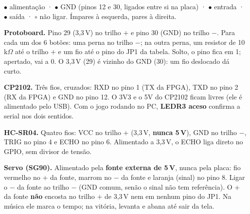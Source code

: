 \documentclass[9pt,a4paper]{extarticle}
\begin{document}
\textcolor{red!60!black}{$\bullet$} alimentação ·
$\bullet$ GND (pinos 12 e 30, ligados entre si na placa) ·
\textcolor{blue!60!black}{$\bullet$} entrada ·
\textcolor{green!45!black}{$\bullet$} saída · $\circ$ não ligar.
Ímpares à esquerda, pares à direita.

\textbf{Protoboard.} Pino 29 (3,3\,V) no trilho $+$ e pino 30 (GND) no trilho $-$.
Para cada um dos 6 botões: uma perna no trilho $-$; na outra perna, um resistor de
10\,k$\Omega$ até o trilho $+$ e um fio até o pino do JP1 da tabela. Solto, o pino
fica em 1; apertado, vai a 0. O 3,3\,V (29) é vizinho do GND (30): um fio deslocado
dá curto.

\textbf{CP2102.} Três fios, cruzados: RXD no pino 1 (TX da FPGA), TXD no pino 2 (RX da
FPGA) e GND no pino 12. O 3V3 e o 5V do CP2102 ficam livres (ele é alimentado pelo USB).
Com o jogo rodando no PC, \textbf{LEDR3 aceso} confirma a serial nos dois sentidos.

\textbf{HC-SR04.} Quatro fios: VCC no trilho $+$ (3,3\,V, \textbf{nunca 5\,V}), GND no
trilho $-$, TRIG no pino 4 e ECHO no pino 6. Alimentado a 3,3\,V, o ECHO liga direto no
GPIO, sem divisor de tensão.

\textbf{Servo (SG90).} Alimentado pela \textbf{fonte externa de 5\,V}, nunca pela placa:
fio vermelho no $+$ da fonte, marrom no $-$ da fonte e laranja (sinal) no pino 8. Ligar
o $-$ da fonte ao trilho $-$ (GND comum, senão o sinal não tem referência). O $+$ da
fonte \textbf{não} encosta no trilho $+$ de 3,3\,V nem em nenhum pino do JP1.
Na música ele marca o tempo; na vitória, levanta e abana até sair da tela.
\end{document}

